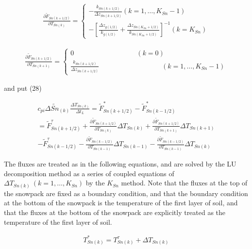 \begin{eqnarray}
 \frac{\partial \widetilde{F}_{Sn(k+1/2)}}{\partial T_{Sn(k)}} =
\left\{
\begin{array}{ll}
\displaystyle{
- \frac{k_{Sn(k+1/2)}}{\Delta z_{Sn(k+1/2)}}
}
 (k=1,\ldots,K_{Sn}-1) \\
\displaystyle{
- \left[\frac{\Delta z_{g(1/2)}}{k_{g(1/2)}}
+\frac{\Delta z_{Sn(K_{Sn}+1/2)}}{k_{Sn(K_{Sn}+1/2)}}
\right]^{-1}
}
 (k=K_{Sn})
\end{array}
\right.
\end{eqnarray}

\begin{eqnarray}
 \frac{\partial \widetilde{F}_{Sn(k+1/2)}}{\partial T_{Sn(k+1)}} =
\left\{
\begin{array}{ll}
0  \ \quad \qquad \qquad \qquad \qquad (k=0) \\
\displaystyle{
\frac{k_{Sn(k+1/2)}}{\Delta z_{Sn(k+1/2)}}
}
   \ \quad \qquad \qquad \qquad \qquad (k=1,\ldots,K_{Sn}-1)
\end{array}
\right.
\end{eqnarray}

and put (28)

\begin{eqnarray}
c_{pi}\Delta \widetilde{Sn}_{(k)} \frac{\Delta T_{Sn(k)}}{\Delta t_L}
= \widetilde{F}_{Sn(k+1/2)}^* - \widetilde{F}_{Sn(k-1/2)}^*  \\
= \widetilde{F}_{Sn(k+1/2)}^{\tau}
+\frac{\partial \widetilde{F}_{Sn(k+1/2)}}{\partial T_{Sn(k)}}
 \Delta T_{Sn(k)}
+\frac{\partial \widetilde{F}_{Sn(k+1/2)}}{\partial T_{Sn(k+1)}}
 \Delta T_{Sn(k+1)}  \\
- \widetilde{F}_{Sn(k-1/2)}^{\tau}
-\frac{\partial \widetilde{F}_{Sn(k-1/2)}}{\partial T_{Sn(k-1)}}
 \Delta T_{Sn(k-1)}
-\frac{\partial \widetilde{F}_{Sn(k-1/2)}}{\partial T_{Sn(k-1)}}
 \Delta T_{Sn(k)}
\end{eqnarray}

The fluxes are treated as in the following equations, and are solved by
the LU decomposition method as a series of coupled equations of
\(\Delta T_{Sn(k)}\ (k=1,\ldots,K_{Sn})\) by the \(K_{Sn}\) method. Note
that the fluxes at the top of the snowpack are fixed as a boundary
condition, and that the boundary condition at the bottom of the snowpack
is the temperature of the first layer of soil, and that the fluxes at
the bottom of the snowpack are explicitly treated as the temperature of
the first layer of soil.

\begin{eqnarray}
 T_{Sn(k)}^* = T_{Sn(k)}^{\tau} + \Delta T_{Sn(k)}
\end{eqnarray}

